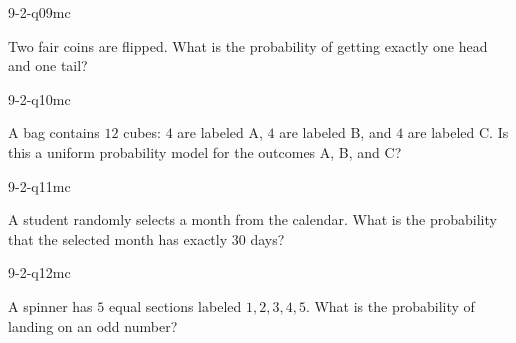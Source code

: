 \begin{practiceQuestion}{9-2-q09}{mc}
\begin{questionText}
Two fair coins are flipped. What is the probability of getting exactly one head and one tail?
\end{questionText}
\end{practiceQuestion}

\begin{practiceQuestion}{9-2-q10}{mc}
\begin{questionText}
A bag contains $12$ cubes: $4$ are labeled A, $4$ are labeled B, and $4$ are labeled C. Is this a uniform probability model for the outcomes A, B, and C?
\end{questionText}
\end{practiceQuestion}

\begin{practiceQuestion}{9-2-q11}{mc}
\begin{questionText}
A student randomly selects a month from the calendar. What is the probability that the selected month has exactly $30$ days?
\end{questionText}
\end{practiceQuestion}

\begin{practiceQuestion}{9-2-q12}{mc}
\begin{questionText}
A spinner has $5$ equal sections labeled $1, 2, 3, 4, 5$. What is the probability of landing on an odd number?
\end{questionText}
\end{practiceQuestion}

